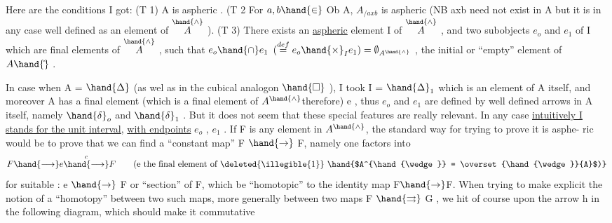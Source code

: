  

Here are the conditions I got:
(T 1) A is aspheric .
(T 2\over{)}{)} For $a,b \hand{\in}$ Ob A, $A_{/axb}$ is aspheric  (NB axb need not exist in A
but it is in any case well defined as an element of $\overset{\hand{\wedge}}{A}$ ).
(T 3) There exists an \uline{aspheric} element I of $\overset{\hand{\wedge}}{A}$ , and two subobjects
$e_o$ and $e_1$ of I which are final elements of $\overset{\hand{\wedge}}{A}$ , such that
$e_o \hand{\cap} e_1$ $(\overset{def}{=} e_o \hand{\times}_I e_1) = \emptyset_{A^{\hand{\wedge}}}$ , the initial or ``empty'' element of $A\hand{\hat{}}$ .

In case when A = $\hand{\Delta}$ (as wel as in the cubical analogon $\hand{\Box}$ ), I took
I = $\hand{\Delta}_1$ which is an element of A itself, and  moreover A has a final
element (which is a final element of $A^{\hand{\wedge}}$\hand{/}therefore) e , thus $e_o$ and $e_1$ are
defined by well defined arrows in A itself, namely $\hand{\delta}_o$ and $\hand{\delta}_1$ . But it
does not seem that these special features are really relevant. In any case
\uline{intuitively I stands for the unit interval}, \uline{with endpoints} $e_o$ , $e_1$ . If
F is any element in $A^{\hand{\wedge}}$, the standard way for trying to prove it is asphe-%
ric would be to prove that we can find a ``constant map'' F $\hand{\to}$ F, namely one
 factors into
\[ F \hand{\longrightarrow} e \overset{c}{\hand{\longrightarrow}} F \qquad \text{(e the final element of \deleted{\illegible{1}} \hand{$A^{\hand{\wedge}} = \overset{\hand{\wedge}}{A}$)}} \]
for suitable  : e $\hand{\to}$ F or ``section'' of F, which be ``homotopic'' to the
identity map F$\hand{\to}$F. When trying to make explicit the notion of a ``homotopy''
 between two such maps, more generally between two  maps F $\hand{\rightrightarrows}$ G , we
hit of course upon the arrow h in the following diagram, which should
make it commutative

